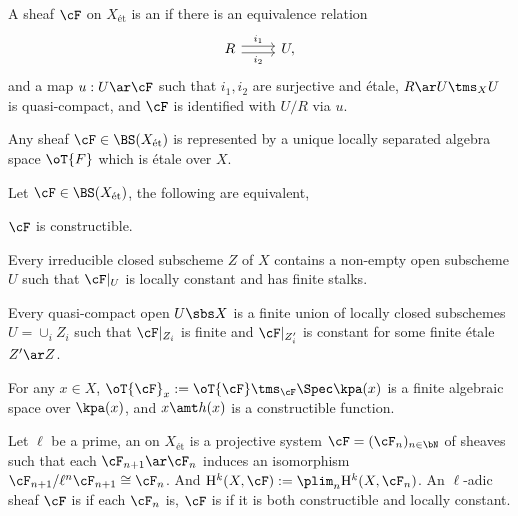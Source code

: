 \documentclass[a4paper, twoside]{article}
\begin{document}
\begin{dfn}
  A sheaf $\cF$ on $X_{\text{{\'e}t}}$ is an  if there is an equivalence relation
  \[
    \begin{tikzcd}
      R\ar[r, shift left=1, "i_{1}"]\ar[r, shift right=1, "i_{2}"'] & U,
    \end{tikzcd}
  \]
  and a map $u:U\ar \cF$ such that $i_{1},i_{2}$ are surjective and {\'e}tale, $R\ar U\tms_{X}U$ is quasi-compact, and $\cF$ is identified with $U/R$ via $u$.
\end{dfn}

\begin{thm}
  Any sheaf $\cF\in\BS(X_{\text{{\'e}t}})$ is represented by a unique locally separated algebra space $\oT{F}$ which is {\'e}tale over $X$.
\end{thm}

\begin{thm}
  Let $\cF\in\BS(X_{\text{{\'e}t}})$, the following are equivalent,
  \begin{enr}
    \item $\cF$ is constructible.
    \item Every irreducible closed subscheme $Z$ of $X$ contains a non-empty open subscheme $U$ such that $\cF|_{U}$ is locally constant and has finite stalks.
    \item Every quasi-compact open $U\sbs X$ is a finite union of locally closed subschemes $U=\cup_{i}Z_{i}$ such that $\cF|_{Z_{i}}$ is finite and $\cF|_{Z_{i}'}$ is constant for some finite {\'e}tale $Z'\ar Z$.
    \item For any $x\in X$, $\oT{\cF}_{x}:=\oT{\cF}\tms_{\cF}\Spec \kpa(x)$ is a finite algebraic space over $\kpa(x)$, and $x\amt h(x)$ is a constructible function.
  \end{enr}
\end{thm}

\begin{dfn}
  Let $\ell$ be a prime, an  on $X_{\text{{\'e}t}}$ is a projective system $\cF=(\cF_{n})_{n\in\bN}$ of sheaves such that each $\cF_{n+1}\ar\cF_{n}$ induces an isomorphism $\cF_{n+1}/\ell^{n}\cF_{n+1}\cong\cF_{n}$. And $\mathrm{H}_{}^{k}(X,\cF):=\plim_{n}\mathrm{H}_{}^{k}(X,\cF_{n})$. An $\ell$-adic sheaf $\cF$ is  if each $\cF_{n}$ is, $\cF$ is  if it is both constructible and locally constant.
\end{dfn}
\end{document}
